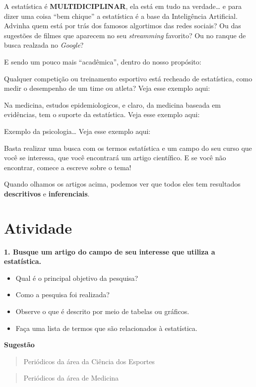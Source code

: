 \documentclass[
]{book}
\begin{document}
A estatística é \textbf{MULTIDICIPLINAR}, ela está em tudo na verdade\ldots{} e para dizer uma coisa ``bem chique'' a estatística é a base da Inteligência Artificial. Advinha quem está por trás dos famosos algortimos das redes sociais? Ou das sugestões de filmes que aparecem no seu \emph{streamming} favorito? Ou no ranque de busca realzada no \emph{Google}?

E sendo um pouco mais ``acadêmica'', dentro do nosso propósito:

Qualquer competição ou treinamento esportivo está recheado de estatística, como medir o desempenho de um time ou atleta? Veja esse exemplo aqui:

Na medicina, estudos epidemiologicos, e claro, da medicina baseada em evidências, tem o suporte da estatística. Veja esse exemplo aqui:

Exemplo da psicologia\ldots{} Veja esse exemplo aqui:

Basta realizar uma busca com os termos estatística e um campo do seu curso que você se interessa, que você encontrará um artigo científico. E se você não encontrar, comece a escreve sobre o tema!

Quando olhamos os artigos acima, podemos ver que todos eles tem resultados \textbf{descritivos} e \textbf{inferenciais}.

\hypertarget{atividade}{%
\section{Atividade}\label{atividade}}

\textbf{1. Busque um artigo do campo de seu interesse que utiliza a estatística.}

\begin{itemize}
\item
  Qual é o principal objetivo da pesquisa?
\item
  Como a pesquisa foi realizada?
\item
  Observe o que é descrito por meio de tabelas ou gráficos.
\item
  Faça uma lista de termos que são relacionados à estatística.
\end{itemize}

\textbf{Sugestão}

\begin{quote}
Periódicos da área da Ciência dos Esportes
\end{quote}

\begin{quote}
Periódicos da área de Medicina
\end{quote}
\end{document}
